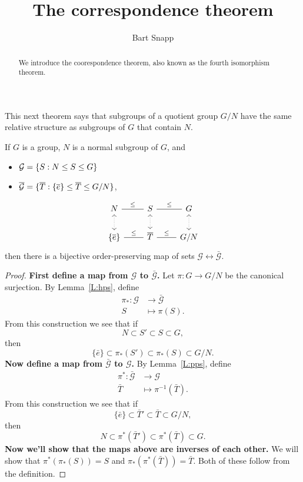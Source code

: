 \documentclass{ximera}
\author{Bart Snapp}
\title{The correspondence theorem}
\begin{document}
\begin{abstract}
  We introduce the coorespondence theorem, also known as the fourth
  isomorphism theorem.
\end{abstract}
\maketitle

This next theorem says that subgroups of a quotient group $G/N$ have
the same relative structure as subgroups of $G$ that contain $N$.

\begin{theorem}
  If $G$ is a group, $N$ is a normal subgroup of $G$, and
  \begin{itemize}
  \item $\mathcal{G} = \{S:N\leq S\leq G\}$
  \item $\mathcal{\overline{G}} = \{\overline{T}:\{\overline{e}\}\leq \overline{T}\leq G/N\}$,
  \end{itemize}
  \[
  \begin{tikzcd}
    N \ar[r,-,"\subgp"] \ar[d,<->,dotted]& S\ar[r,-,"\subgp"] \ar[d,<->,dotted]& G \ar[d,<->,dotted]\\
    \{\bar{e}\} \ar[r,-,"\subgp"] & \bar{T} \ar[r,-,"\subgp"] & G/N
  \end{tikzcd}
  \]
  then there is a bijective order-preserving map of sets
  $\mathcal{G}\leftrightarrow\mathcal{\bar{G}}$.
  \begin{proof}
    \textbf{First define a map from $\pmb{\mathcal{G}}$ to
      $\pmb{\mathcal{\bar{G}}}$.} Let $\pi:G\to G/N$ be the canonical
    surjection.  By Lemma~\ref{L:hps}, define
    \begin{align*}
    \pi_*:\mathcal{G} &\to \bar{\mathcal{G}}\\
    S &\mapsto \pi(S).
    \end{align*}
    From this construction we see that if
    \[
    N \subset S'\subset S \subset G,
    \]
    then
    \[
    \{\bar{e}\}\subset \pi_*(S') \subset \pi_*(S)\subset G/N.
    \]
    \textbf{Now define a map from $\pmb{\mathcal{\bar{G}}}$ to
      $\pmb{\mathcal{G}}$.}
    By Lemma~\ref{L:pps}, define
    \begin{align*}
      \pi^*:\bar{\mathcal{G}} &\to \mathcal G\\ \bar{T} &\mapsto
      \pi^{-1}(\bar{T}).
    \end{align*}
    From this construction we see that if
    \[
    \{\bar{e}\} \subset \bar{T}\hspace{0em}' \subset \bar{T} \subset G/N,
    \]
    then
    \[
    N \subset \pi^*(\bar{T}\hspace{0em}')\subset \pi^*(\bar{T}) \subset G.
    \]
    \textbf{Now we'll show that the maps above are inverses of each
      other.} We will show that $\pi^*(\pi_*(S)) = S$ and
    $\pi_*(\pi^*(\bar T)) = \bar{T}$. Both of these follow from the
    definition.


\end{proof}
\end{theorem}
\end{document}
